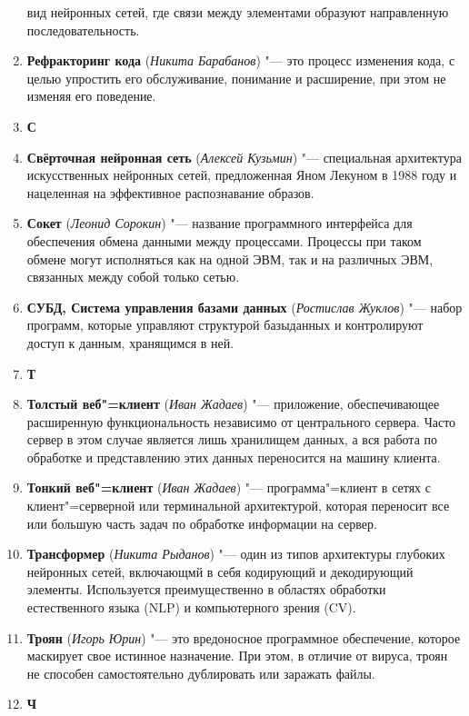 \documentclass[a4paper, 14 pt]{extarticle}
\begin{document}
\begin{enumerate}
    вид нейронных сетей, где связи между элементами образуют направленную 
    последовательность.
    \item \textbf{Рефракторинг кода} (\textit{Никита Барабанов}) "--- это 
    процесс изменения кода, с целью упростить его обслуживание, понимание и 
    расширение, при этом не изменяя его поведение. 
    \item[] \textbf{С}
    \item \textbf{Свёрточная нейронная сеть} (\textit{Алексей Кузьмин}) "--- 
    специальная архитектура искусственных нейронных сетей, предложенная Яном 
    Лекуном в 1988 году и нацеленная на эффективное распознавание образов. 
    \item \textbf{Сокет} (\textit{Леонид Сорокин}) "--- название программного 
    интерфейса для обеспечения обмена данными между процессами. Процессы при 
    таком обмене могут исполняться как на одной ЭВМ, так и на различных ЭВМ, 
    связанных между собой только сетью. 
    \item \textbf{СУБД, Система управления базами данных} 
    (\textit{Ростислав Жуклов}) "--- набор программ, которые управляют 
    структурой базыданных и контролируют доступ к данным, хранящимся в ней. 
    \item[] \textbf{Т}
    \item \textbf{Толстый веб"=клиент} (\textit{Иван Жадаев}) "--- приложение, 
    обеспечивающее расширенную функциональность независимо от центрального 
    сервера. Часто сервер в этом случае является лишь хранилищем данных, а вся 
    работа по обработке и представлению этих данных переносится на машину 
    клиента.
    \item \textbf{Тонкий веб"=клиент} (\textit{Иван Жадаев}) "--- 
    программа"=клиент в сетях с клиент"=серверной или терминальной архитектурой, 
    которая переносит все или большую часть задач по обработке информации на 
    сервер.
    \item \textbf{Трансформер} (\textit{Никита Рыданов}) "--- один из типов 
    архитектуры глубоких нейронных сетей, включающмй в себя кодирующий и 
    декодирующий элементы. Используется преимущественно в областях обработки 
    естественного языка (NLP) и компьютерного зрения (CV).
    \item \textbf{Троян} (\textit{Игорь Юрин}) "--- это вредоносное программное 
    обеспечение, которое маскирует свое истинное назначение. При этом, в отличие 
    от вируса, троян не способен самостоятельно дублировать или заражать файлы. 
    \item[] \textbf{Ч}

\end{enumerate}
\end{document}
